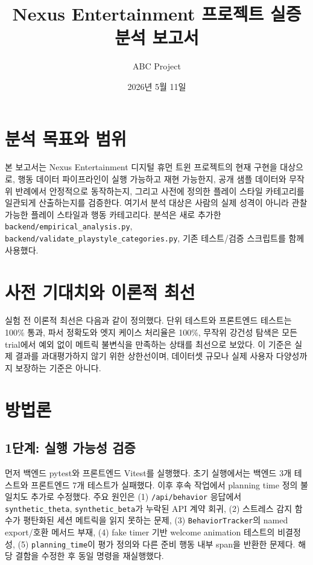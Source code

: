 \documentclass[11pt,a4paper]{article}
\title{Nexus Entertainment 프로젝트 실증분석 보고서}
\author{ABC Project}
\date{2026년 5월 11일}
\begin{document}
\maketitle

\section{분석 목표와 범위}
본 보고서는 Nexus Entertainment 디지털 휴먼 트윈 프로젝트의 현재 구현을 대상으로,
행동 데이터 파이프라인이 실행 가능하고 재현 가능한지, 공개 샘플 데이터와 무작위 반례에서
안정적으로 동작하는지, 그리고 사전에 정의한 플레이 스타일 카테고리를 일관되게 산출하는지를
검증한다. 여기서 분석 대상은 사람의 실제 성격이 아니라 관찰 가능한 플레이 스타일과 행동
카테고리다. 분석은 새로 추가한 \texttt{backend/empirical\_analysis.py},
\texttt{backend/validate\_playstyle\_categories.py}, 기존 테스트/검증 스크립트를 함께 사용했다.

\section{사전 기대치와 이론적 최선}
실험 전 이론적 최선은 다음과 같이 정의했다. 단위 테스트와 프론트엔드 테스트는 100\% 통과,
파서 정확도와 엣지 케이스 처리율은 100\%, 무작위 강건성 탐색은 모든 trial에서 예외 없이
메트릭 불변식을 만족하는 상태를 최선으로 보았다. 이 기준은 실제 결과를 과대평가하지 않기 위한
상한선이며, 데이터셋 규모나 실제 사용자 다양성까지 보장하는 기준은 아니다.

\section{방법론}
\subsection{1단계: 실행 가능성 검증}
먼저 백엔드 pytest와 프론트엔드 Vitest를 실행했다. 초기 실행에서는 백엔드 3개 테스트와
프론트엔드 7개 테스트가 실패했다. 이후 후속 작업에서 planning time 정의 불일치도 추가로
수정했다. 주요 원인은 (1) \texttt{/api/behavior} 응답에서
\texttt{synthetic\_theta}, \texttt{synthetic\_beta}가 누락된 API 계약 회귀,
(2) 스트레스 감지 함수가 평탄화된 세션 메트릭을 읽지 못하는 문제,
(3) \texttt{BehaviorTracker}의 named export/호환 메서드 부재,
(4) fake timer 기반 welcome animation 테스트의 비결정성,
(5) \texttt{planning\_time}이 평가 정의와 다른 준비 행동 내부 span을 반환한 문제다.
해당 결함을 수정한 후 동일 명령을 재실행했다.
\end{document}
